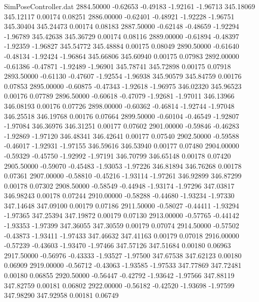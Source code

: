 \begin{filecontents}{SimPoseController.dat}
2884.50000   -0.62653   -0.49183    -1.92161   -1.96713  345.18069  345.12117    0.00174    0.08251
2886.00000   -0.62401   -0.48921    -1.92228   -1.96751  345.30404  345.24473    0.00174    0.08183
2887.50000   -0.62148   -0.48659    -1.92294   -1.96789  345.42638  345.36729    0.00174    0.08116
2889.00000   -0.61894   -0.48397    -1.92359   -1.96827  345.54772  345.48884    0.00175    0.08049
2890.50000   -0.61640   -0.48134    -1.92424   -1.96864  345.66806  345.60940    0.00175    0.07983
2892.00000   -0.61386   -0.47871    -1.92489   -1.96901  345.78741  345.72898    0.00175    0.07918
2893.50000   -0.61130   -0.47607    -1.92554   -1.96938  345.90579  345.84759    0.00176    0.07853
2895.00000   -0.60875   -0.47343    -1.92618   -1.96975  346.02320  345.96523    0.00176    0.07789
2896.50000   -0.60618   -0.47079    -1.92681   -1.97011  346.13966  346.08193    0.00176    0.07726
2898.00000   -0.60362   -0.46814    -1.92744   -1.97048  346.25518  346.19768    0.00176    0.07664
2899.50000   -0.60104   -0.46549    -1.92807   -1.97084  346.36976  346.31251    0.00177    0.07602
2901.00000   -0.59846   -0.46283    -1.92869   -1.97120  346.48341  346.42641    0.00177    0.07540
2902.50000   -0.59588   -0.46017    -1.92931   -1.97155  346.59616  346.53940    0.00177    0.07480
2904.00000   -0.59329   -0.45750    -1.92992   -1.97191  346.70799  346.65148    0.00178    0.07420
2905.50000   -0.59070   -0.45483    -1.93053   -1.97226  346.81894  346.76268    0.00178    0.07361
2907.00000   -0.58810   -0.45216    -1.93114   -1.97261  346.92899  346.87299    0.00178    0.07302
2908.50000   -0.58549   -0.44948    -1.93174   -1.97296  347.03817  346.98243    0.00178    0.07244
2910.00000   -0.58288   -0.44680    -1.93234   -1.97330  347.14648  347.09100    0.00179    0.07186
2911.50000   -0.58027   -0.44411    -1.93294   -1.97365  347.25394  347.19872    0.00179    0.07130
2913.00000   -0.57765   -0.44142    -1.93353   -1.97399  347.36055  347.30559    0.00179    0.07074
2914.50000   -0.57502   -0.43873    -1.93411   -1.97433  347.46632  347.41163    0.00179    0.07018
2916.00000   -0.57239   -0.43603    -1.93470   -1.97466  347.57126  347.51684    0.00180    0.06963
2917.50000   -0.56976   -0.43333    -1.93527   -1.97500  347.67538  347.62123    0.00180    0.06909
2919.00000   -0.56712   -0.43063    -1.93585   -1.97533  347.77869  347.72481    0.00180    0.06855
2920.50000   -0.56447   -0.42792    -1.93642   -1.97566  347.88119  347.82759    0.00181    0.06802
2922.00000   -0.56182   -0.42520    -1.93698   -1.97599  347.98290  347.92958    0.00181    0.06749

\end{filecontents}
